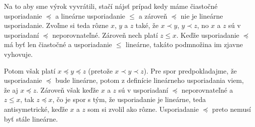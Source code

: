 
Na to aby sme výrok vyvrátili, stačí nájsť prípad kedy máme čiastočné 
usporiadanie $\preceq$ a lineárne usporiadanie $\leq$ a zároveň 
$\preccurlyeq$ nie je lineárne usporiadanie. Zvoľme si teda rôzne 
$x$, $y$ a $z$ také, že $x\prec y$, $y\prec z$, no $x$ a $z$ sú 
v usporiadaní $\preceq$ neporovnateľné. Zároveň nech platí $z\leq x$. 
Keďže usporiadanie $\preceq$ má byť len čiastočné a usporiadanie 
$\leq$ lineárne, takáto podmnožina im zjavne vyhovuje. 

Potom však platí $x\preccurlyeq y\preccurlyeq z$ (pretože 
$x\prec y\prec z$). Pre spor predpokladajme, že usporiadanie 
$\preccurlyeq$ bude lineárne, potom z definície lineárneho usporiadania 
viem, že aj $x\preccurlyeq z$. Zároveň však keďže $x$ a $z$ sú 
v usporiadaní $\preceq$ neporovnateľné a $z\leq x$, tak 
$z\preccurlyeq x$, čo je spor s tým, že usporiadanie je lineárne, teda 
antisymetrické, keďže $x$ a $z$ som si zvolil ako rôzne. Usporiadanie 
$\preccurlyeq$ preto nemusí byť stále lineárne.

